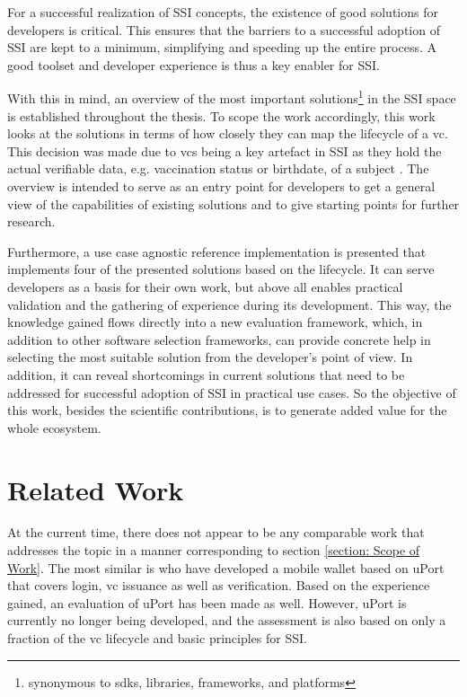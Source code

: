 	For a successful realization of \acf{SSI} concepts, the existence of good solutions for developers is critical. This ensures that the barriers to a successful adoption of \ac{SSI} are kept to a minimum, simplifying and speeding up the entire process. A good toolset and developer experience is thus a key enabler for \ac{SSI}.
	
	With this in mind, an overview of the most important solutions\footnote{synonymous to \acp{sdk}, libraries, frameworks, and platforms} in the \ac{SSI} space is established throughout the thesis. To scope the work accordingly, this work looks at the solutions in terms of how closely they can map the lifecycle of a \acf{vc}. This decision was made due to \acsp{vc} being a key artefact in \ac{SSI} as they hold the actual verifiable data, e.g. vaccination status or birthdate, of a subject \cite{sporny_verifiable_2019}. The overview is intended to serve as an entry point for developers to get a general view of the capabilities of existing solutions and to give starting points for further research. 
	
	Furthermore, a use case agnostic reference implementation is presented that implements four of the presented solutions based on the lifecycle. It can serve developers as a basis for their own work, but above all enables practical validation and the gathering of experience during its development. This way, the knowledge gained flows directly into a new evaluation framework, which, in addition to other software selection frameworks, can provide concrete help in selecting the most suitable solution from the developer's point of view. In addition, it can reveal shortcomings in current solutions that need to be addressed for successful adoption of \ac{SSI} in practical use cases. So the objective of this work, besides the scientific contributions, is to generate added value for the whole ecosystem.
	
	\section{Related Work} %
	
	At the current time, there does not appear to be any comparable work that addresses the topic in a manner corresponding to section \ref{section: Scope of Work}. The most similar is \cite{naik_uport_2020} who have developed a mobile wallet based on uPort that covers login, \ac{vc} issuance as well as verification. Based on the experience gained, an evaluation of uPort has been made as well. However, uPort is currently no longer being developed, and the assessment is also based on only a fraction of the \acs{vc} lifecycle and basic principles for \ac{SSI}.
	

